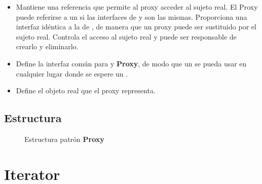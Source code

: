 \begin{itemize}
\item \Proxy Mantiene una referencia que permite al proxy acceder al sujeto real. El Proxy puede referirse a un \Sujuteo si las interfaces de \SujetoRea y \Sujeto son las mismas.
Proporciona una interfaz idéntica a la de \Sujeto, de manera que un proxy puede ser sustituido por el sujeto real.
Controla el acceso al sujeto real y puede ser responsable de crearlo y eliminarlo.

\item \Sujeto Define la interfaz común para \SujetoReal y \textbf{Proxy}, de modo que un \Proxy se pueda usar en cualquier lugar donde se espere un \SujetoReal.

\item \RealSubject Define el objeto real que el proxy representa.

\end{itemize}


\subsection*{Estructura}


\begin{figure}[h]
\caption{Estructura patrón \textbf{Proxy}}
\begin{center}
\end{center}
\end{figure}




\section{Iterator}
\label{patronIterator}

